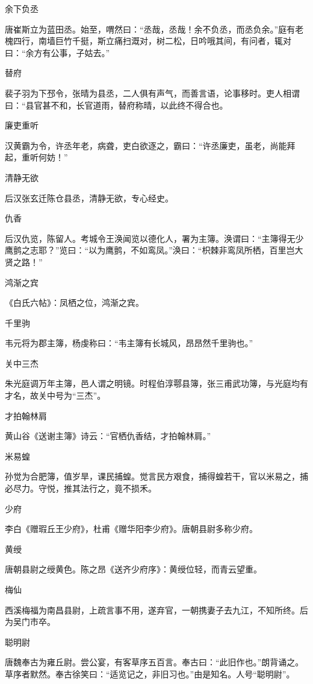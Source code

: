 \documentclass[a4paper,12pt,UTF8,twoside]{ctexbook}
\begin{document}
    余下负丞
    
    唐崔斯立为蓝田丞。始至，喟然曰：“丞哉，丞哉！余不负丞，而丞负余。”庭有老槐四行，南墙巨竹千挺，斯立痛扫溉对，树二松，日吟哦其间，有问者，辄对曰：“余方有公事，子姑去。”
    
    替府
    
    裴子羽为下邳令，张晴为县丞，二人俱有声气，而善言语，论事移时。吏人相谓曰：“县官甚不和，长官道雨，替府称晴，以此终不得合也。
    
    廉吏重听
    
    汉黄霸为令，许丞年老，病聋，吏白欲逐之，霸曰：“许丞廉吏，虽老，尚能拜起，重听何妨！”
    
    清静无欲
    
    后汉张玄迁陈仓县丞，清静无欲，专心经史。
    
    仇香
    
    后汉仇览，陈留人。考城令王涣闻览以德化人，署为主簿。涣谓曰：“主簿得无少鹰鹯之志耶？”览曰：“以为鹰鹯，不如鸾凤。”涣曰：“枳棘非鸾凤所栖，百里岂大贤之路！”
    
    鸿渐之宾
    
    《白氏六帖》：凤栖之位，鸿渐之宾。
    
    千里驹
    
    韦元将为郡主簿，杨虔称曰：“韦主簿有长城风，昂昂然千里驹也。”
    
    关中三杰
    
    朱光庭调万年主簿，邑人谓之明镜。时程伯淳鄠县簿，张三甫武功簿，与光庭均有才名，故关中号为“三杰”。
    
    才拍翰林肩
    
    黄山谷《送谢主簿》诗云：“官栖仇香结，才拍翰林肩。”
    
    米易蝗
    
    孙觉为合肥簿，值岁旱，课民捕蝗。觉言民方艰食，捕得蝗若干，官以米易之，捕必尽力。守悦，推其法行之，竟不损禾。
    
    少府
    
    李白《赠瑕丘王少府》，杜甫《赠华阳李少府》。唐朝县尉多称少府。
    
    黄绶
    
    唐朝县尉之绶黄色。陈之昂《送齐少府序》：黄绶位轻，而青云望重。
    
    梅仙
    
    西溪梅福为南昌县尉，上疏言事不用，遂弃官，一朝携妻子去九江，不知所终。后为吴门市卒。
    
    聪明尉
    
    唐魏奉古为雍丘尉。尝公宴，有客草序五百言。奉古曰：“此旧作也。”朗背诵之。草序者默然。奉古徐笑曰：“适览记之，非旧习也。”由是知名。人号“聪明尉”。
    
\end{document}
